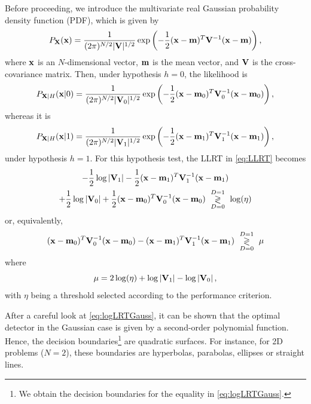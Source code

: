 Before proceeding, we introduce the multivariate real Gaussian probability density function (PDF), which is given by
\begin{equation*}
P_{{\bf X}}({\bf x}) = \frac{1}{(2\pi)^{N/2} |{\bf V}|^{1/2}}
\exp\left(-\frac{1}{2}({\bf x}-{\bf m})^T {\bf V}^{-1}({\bf x}-{\bf m})\right),
\label{pXGauss}
\end{equation*}
where ${\bf x}$ is an $N$-dimensional vector, ${\bf m}$ is the mean vector, and ${\bf V}$ is the cross-covariance matrix. Then, under hypothesis $h = 0$, the likelihood is
\begin{equation*}
P_{{\bf X}|H}({\bf x}|0) = \frac{1}{(2\pi)^{N/2} |{\bf V}_0|^{1/2}}
\exp\left(-\frac{1}{2}({\bf x}-{\bf m}_0)^T {\bf V}_0^{-1}({\bf x}-{\bf m}_0)\right),
\end{equation*}
whereas it is
\begin{equation*}
P_{{\bf X}|H}({\bf x}|1) = \frac{1}{(2\pi)^{N/2} |{\bf V}_1|^{1/2}}
\exp\left(-\frac{1}{2}({\bf x}-{\bf m}_1)^T {\bf V}_1^{-1}({\bf x}-{\bf m}_1)\right),
\end{equation*}
under hypothesis $h = 1$. For this hypothesis test, the LLRT in \eqref{eq:LLRT} becomes
\begin{multline*}
- \frac{1}{2}\log\left|{\bf V}_1 \right| 
- \frac{1}{2}({\bf x}-{\bf m}_1)^T {\bf V}_1^{-1}({\bf x}-{\bf m}_1) \\
+ \frac{1}{2}\log\left|{\bf V}_0 \right| 
+ \frac{1}{2}({\bf x}-{\bf m}_0)^T {\bf V}_0^{-1}({\bf x}-{\bf m}_0) 
\,\, \underset{D=0}{\overset{D=1}{\gtrless}}\,\, \log(\eta) 
\end{multline*}
or, equivalently,
\begin{align}
({\bf x}-{\bf m}_0)^T {\bf V}_0^{-1}({\bf x}-{\bf m}_0) 
- ({\bf x}-{\bf m}_1)^T {\bf V}_1^{-1}({\bf x}-{\bf m}_1)
\,\, \underset{D=0}{\overset{D=1}{\gtrless}}\,\, \mu
\label{eq:logLRTGauss}
\end{align}
where
\begin{equation*}
\mu = 2 \log(\eta) + \log\left|{\bf V}_1 \right| - \log\left|{\bf V}_0 \right|,
\end{equation*}
with $\eta$ being a threshold selected according to the performance criterion.

After a careful look at \eqref{eq:logLRTGauss}, it can be shown that the optimal detector in the Gaussian case is given by a second-order polynomial function. Hence, the decision boundaries\footnote{We obtain the decision boundaries for the equality in \eqref{eq:logLRTGauss}.} are quadratic surfaces. For instance, for 2D problems ($N = 2$), these boundaries are hyperbolas, parabolas, ellipses or straight lines.

